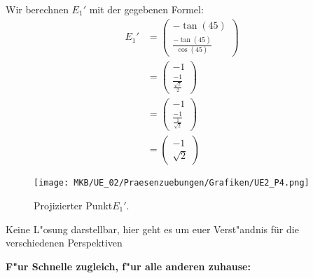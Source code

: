 \begin{Loesung}
\begin{Teilloesungen}
\usetikzlibrary{calc}

\item Wir berechnen $E_1'$ mit der gegebenen 	Formel: \\
	\begin{align*}
		E_1' &= \begin{pmatrix}- \tan(45)\\  \frac{- \tan(45)}{{\cos(45)}}\end{pmatrix}\\	
		&= \begin{pmatrix}-1\\  \frac{-1}{\frac{\sqrt{2}}{2}}\end{pmatrix}\\
		&= \begin{pmatrix}-1\\  \frac{-1}{\frac{1}{\sqrt{2}}}\end{pmatrix}\\	
		&= \begin{pmatrix}-1\\ \sqrt{2} \end{pmatrix}
	\end{align*}

\begin{figure}[H]
	\centering
	\texttt{[image: MKB/UE\_02/Praesenzuebungen/Grafiken/UE2\_P4.png]}
	\caption{Projizierter Punkt$E_1'$.}
	\label{fig.P4}
\end{figure}
	
\item Keine L"osung darstellbar, hier geht es um euer Verst"andnis für die verschiedenen Perspektiven
\end{Teilloesungen}
\end{Loesung}
\small
\textbf{F"ur Schnelle zugleich, f"ur alle anderen zuhause:}
